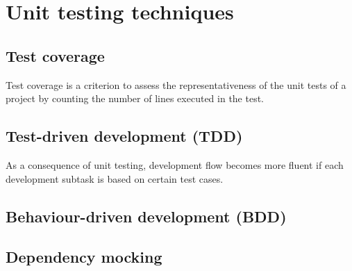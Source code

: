 \section{Unit testing techniques}
\subsection{Test coverage}
Test coverage is a criterion to assess the representativeness of the unit tests of a project by counting the number of lines executed in the test.


\subsection{Test-driven development (TDD)}
As a consequence of unit testing, development flow becomes more fluent if each development subtask is based on certain test cases.

\subsection{Behaviour-driven development (BDD)}


\subsection{Dependency mocking}
